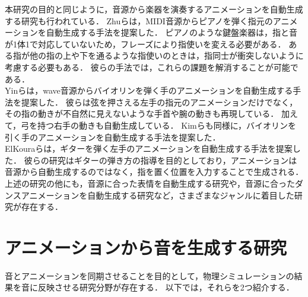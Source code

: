 %
\indent
本研究の目的と同じように，音源から楽器を演奏するアニメーションを自動生成する研究も行われている．
Zhuら\cite{piano}は，MIDI音源からピアノを弾く指元のアニメーションを自動生成する手法を提案した．
ピアノのような鍵盤楽器は，指と音が1体1で対応していないため，フレーズにより指使いを変える必要がある．
ある指が他の指の上や下を通るような指使いのときは，指同士が衝突しないように考慮する必要もある．
彼らの手法では，これらの課題を解消することが可能である．\\
\indent
Yinら\cite{violin}は，wave音源からバイオリンを弾く手のアニメーションを自動生成する手法を提案した．
彼らは弦を押さえる左手の指元のアニメーションだけでなく，その指の動きが不自然に見えないような手首や腕の動きも再現している．
加えて，弓を持つ右手の動きも自動生成している．
Kimら\cite{violin2}も同様に，バイオリンを引く手のアニメーションを自動生成する手法を提案した．\\
\indent
ElKouraら\cite{ElKoura}は，ギターを弾く左手のアニメーションを自動生成する手法を提案した．
彼らの研究はギターの弾き方の指導を目的としており，アニメーションは音源から自動生成するのではなく，指を置く位置を入力することで生成される．\\
%
\indent
上述の研究の他にも，音源に合った表情を自動生成する研究\cite{facial}\cite{DiPaola}\cite{morishima}や，音源に合ったダンスアニメーションを自動生成する研究\cite{dance2}\cite{dance1}など，さまざまなジャンルに着目した研究が存在する．

\section{アニメーションから音を生成する研究}\label{sec:generate_sound}
音とアニメーションを同期させることを目的として，物理シミュレーションの結果を音に反映させる研究分野が存在する．
以下では，それらを2つ紹介する．\\
%
